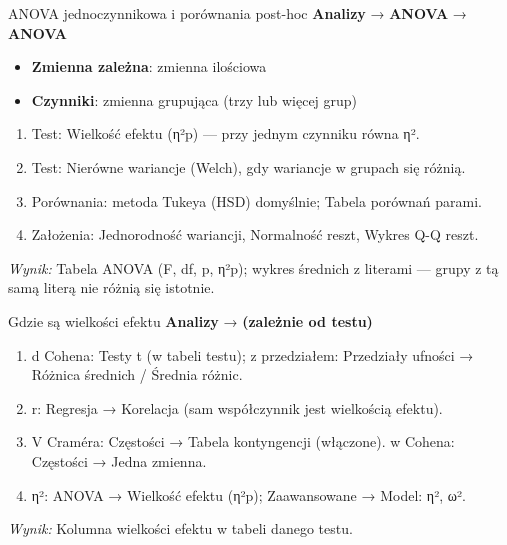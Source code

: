 \documentclass[
  polish,
  10pt,
  a4paper,
  DIV=11,
  numbers=noendperiod]{scrartcl}
\newcommand{\jmenu}[1]{{\color{upwraccent}\small #1}}
\begin{document}
\begin{jbox}{ANOVA jednoczynnikowa i porównania post-hoc}\label{w:anova}
\jmenu{\textbf{Analizy} → \textbf{ANOVA} → \textbf{ANOVA}}

\begin{itemize}
\item[$\triangleright$] \textbf{Zmienna zależna}: zmienna ilościowa
\item[$\triangleright$] \textbf{Czynniki}: zmienna grupująca (trzy lub więcej grup)
\end{itemize}
\begin{enumerate}
\item Test: Wielkość efektu (η²p) — przy jednym czynniku równa η².
\item Test: Nierówne wariancje (Welch), gdy wariancje w grupach się różnią.
\item Porównania: metoda Tukeya (HSD) domyślnie; Tabela porównań parami.
\item Założenia: Jednorodność wariancji, Normalność reszt, Wykres Q-Q reszt.
\end{enumerate}
\textit{Wynik:} Tabela ANOVA (F, df, p, η²p); wykres średnich z literami — grupy z tą samą literą nie różnią się istotnie.

\end{jbox}

\begin{jbox}{Gdzie są wielkości efektu}\label{w:sila-efektu}
\jmenu{\textbf{Analizy} → \textbf{(zależnie od testu)}}

\begin{enumerate}
\item d Cohena: Testy t (w tabeli testu); z przedziałem: Przedziały ufności → Różnica średnich / Średnia różnic.
\item r: Regresja → Korelacja (sam współczynnik jest wielkością efektu).
\item V Craméra: Częstości → Tabela kontyngencji (włączone). w Cohena: Częstości → Jedna zmienna.
\item η²: ANOVA → Wielkość efektu (η²p); Zaawansowane → Model: η², ω².
\end{enumerate}
\textit{Wynik:} Kolumna wielkości efektu w tabeli danego testu.

\end{jbox}
\end{document}
